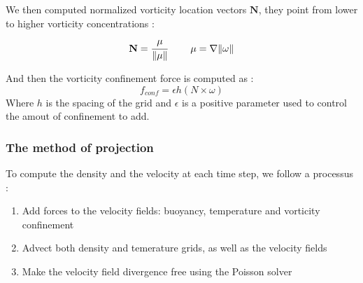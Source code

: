 \documentclass[accepted,single]{gipaper}
\begin{document}
We then computed normalized vorticity location vectors $\mathbf{N}$, they point from lower to higher vorticity concentrations : 
$$ \mathbf{N} = \cfrac{\mathbf{\mu}}{\Vert \mathbf{\mu} \Vert} ~~~~~~~ \mathbf{\mu}=\nabla \Vert \omega \Vert $$

And then the vorticity confinement force is computed as :
$$f_{conf} = \epsilon h (N \times \omega)$$
Where $h$ is the spacing of the grid and $\epsilon$ is a positive parameter used to control the amout of confinement to add.

\subsubsection{The method of projection}
To compute the density and the velocity at each time step, we follow a processus :
\begin{enumerate}
\item Add forces to the velocity fields: buoyancy, temperature and vorticity confinement
\item Advect both density and temerature grids, as well as the velocity fields
\item Make the velocity field divergence free using the Poisson solver
\end{enumerate}







\end{document}
